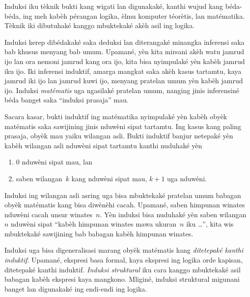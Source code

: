 \documentclass[../../../include/open-logic-section]{subfiles}
\begin{document}


Induksi iku tèknik bukti kang wigati lan digunakaké,
kanthi wujud kang béda-béda, ing meh kabèh pérangan
logika, èlmu komputer téorètis, lan matématika.
Tèknik iki dibutuhaké kanggo mbuktekaké akèh asil
ing logika.

Induksi kerep dibédakaké saka deduksi lan diterangaké
minangka inferensi saka bab khusus menyang bab umum.
Upamané, yèn kita mirsani akèh watu jamrud ijo lan
ora nemoni jamrud kang ora ijo, kita bisa nyimpulaké
yèn kabèh jamrud iku ijo. Iki inferensi induktif,
amarga mangkat saka akèh kasus tartamtu, kaya
jamrud iki ijo lan jamrud kuwi ijo, menyang pratelan
umum yèn kabèh jamrud ijo. Induksi
\emph{matématis} uga ngasilaké pratelan umum,
nanging jinis inferensiné béda banget saka
``induksi prasaja'' mau.

Sacara kasar, bukti induktif ing matématika
nyimpulaké yèn kabèh obyèk matématis saka
sawijining jinis nduwèni sipat tartamtu.
Ing kasus kang paling prasaja, obyèk mau
yaiku wilangan asli. Bukti induktif banjur
netepaké yèn kabèh wilangan asli nduwèni
sipat tartamtu kanthi nuduhaké yèn
\begin{enumerate}
    \item $0$ nduwèni sipat mau, lan
    \item saben wilangan~$k$ kang nduwèni sipat mau,
    $k+1$ uga nduwèni.
\end{enumerate}
Induksi ing wilangan asli asring uga bisa
mbuktekaké pratelan umum babagan obyèk
matématis kang bisa diwènèhi cacah.
Upamané, saben himpunan winates nduwèni
cacah unsur winates~$n$. Yèn induksi
bisa nuduhaké yèn saben wilangan~$n$
nduwèni sipat ``kabèh himpunan winates
mawa ukuran~$n$ iku \dots'', kita wis
mbuktekaké sawijining bab babagan kabèh
himpunan winates.

Induksi uga bisa digeneralisasi marang obyèk
matématis kang \emph{ditetepaké kanthi induktif}.
Upamané, ekspresi basa formal, kaya ekspresi
ing logika orde kapisan, ditetepaké
kanthi induktif. \emph{Induksi struktural}
iku cara kanggo mbuktekaké asil babagan
kabèh ekspresi kaya mangkono. Mliginé,
induksi struktural migunani banget lan
digunakaké ing endi-endi ing logika.
\end{document}
